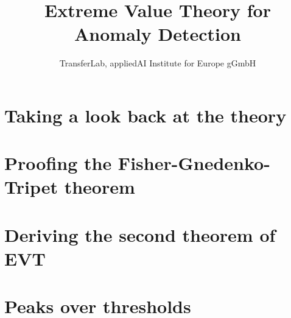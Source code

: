 

\title{Extreme Value Theory for Anomaly Detection}
\author{TransferLab, appliedAI Institute for Europe gGmbH} 



\maketitle 


\section{Taking a look back at the theory}

\newpage


\section{Proofing the Fisher-Gnedenko-Tripet theorem}

\newpage


\section{Deriving the second theorem of EVT}

\newpage


\section{Peaks over thresholds}

\newpage



